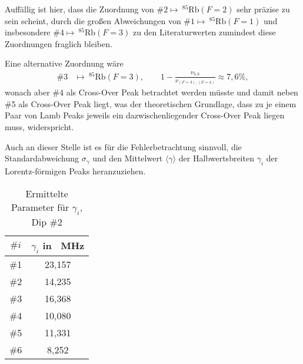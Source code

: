 \noindent Auffällig ist hier, dass die Zuordnung von $\#2 \mapsto \ ^{85}\text{Rb}(F = 2)$ sehr präzise zu sein scheint, durch die großen Abweichungen von $\#1 \mapsto \ ^{85}\text{Rb}(F = 1)$ und insbesondere $\#4 \mapsto \ ^{85}\text{Rb}(F = 3)$ zu den Literaturwerten zumindest diese Zuordnungen fraglich bleiben.

\noindent Eine alternative Zuordnung wäre 
\begin{align*}
    \#3 &\mapsto \ ^{85}\text{Rb}(F = 3), \qquad 1 - \frac{\nu_{3,6}}{\nu_{(F = 3), (F = 4)}} \approx 7,6 \%,
\end{align*}
wonach aber \#4 als Cross-Over Peak betrachtet werden müsste und damit neben \#5 als Cross-Over Peak liegt, was der theoretischen Grundlage, dass zu je einem Paar von Lamb Peaks jeweils ein dazwischenliegender Cross-Over Peak liegen muss, widerspricht. 

\noindent Auch an dieser Stelle ist es für die Fehlerbetrachtung sinnvoll, die Standardabweichung $\sigma_{\gamma}$ und den Mittelwert $\langle \gamma \rangle$ der Halbwertsbreiten $\gamma_{i}$ der Lorentz-förmigen Peaks heranzuziehen.

\begin{table}[H]
    \centering
    \begin{tabular}{|c|c|}
        \hline
         $\#i$      &       $\gamma_{i}$ in \SI{}{\mega \hertz}  \\
        \hline
        \hline
         \#1        &        23,157         \\
        \hline
         \#2        &        14,235         \\
        \hline
         \#3        &        16,368         \\
        \hline
         \#4        &        10,080         \\
        \hline
         \#5        &        11,331         \\
        \hline
         \#6        &         8,252         \\
        \hline
    \end{tabular}
    \caption{Ermittelte Parameter für $\gamma_{i}$, Dip \textcolor{green!50!black}{\#2}}
    \label{tab:gamma-parameter-dip-2}
\end{table}

